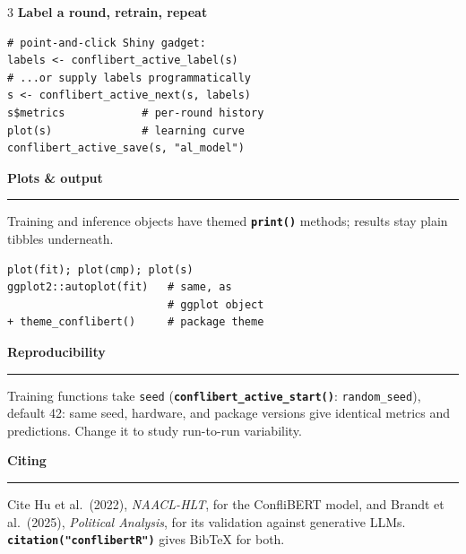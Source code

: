 \documentclass[8pt]{extarticle}
\newcommand{\cbsection}[1]{%
  \vspace{5pt}%
  {\color{cbnavy}\large\bfseries #1\par}\nointerlineskip\vspace{2.5pt}%
  {\color{cbamber}\rule{\linewidth}{1.6pt}\par}\vspace{2pt}%
}
\newcommand{\cbsub}[1]{{\color{cbred}\bfseries #1}\par}
\newcommand{\fn}[1]{\texttt{\bfseries\color{cbnavy}#1}}
\begin{document}
\begin{multicols}{3}
\cbsub{Label a round, retrain, repeat}
\begin{lstlisting}
# point-and-click Shiny gadget:
labels <- conflibert_active_label(s)
# ...or supply labels programmatically
s <- conflibert_active_next(s, labels)
s$metrics            # per-round history
plot(s)              # learning curve
conflibert_active_save(s, "al_model")
\end{lstlisting}

\cbsection{Plots \& output}
Training and inference objects have themed \fn{print()} methods; results stay plain tibbles underneath.
\begin{lstlisting}
plot(fit); plot(cmp); plot(s)
ggplot2::autoplot(fit)   # same, as
                         # ggplot object
+ theme_conflibert()     # package theme
\end{lstlisting}

\cbsection{Reproducibility}
Training functions take \texttt{seed} (\fn{conflibert\_active\_start()}: \texttt{random\_seed}), default 42: same seed, hardware, and package versions give identical metrics and predictions. Change it to study run-to-run variability.

\cbsection{Citing}
Cite Hu et al.\ (2022), \textit{NAACL-HLT}, for the ConfliBERT model, and Brandt et al.\ (2025), \textit{Political Analysis}, for its validation against generative LLMs. \fn{citation("conflibertR")} gives BibTeX for both.

\end{multicols}
\end{document}
